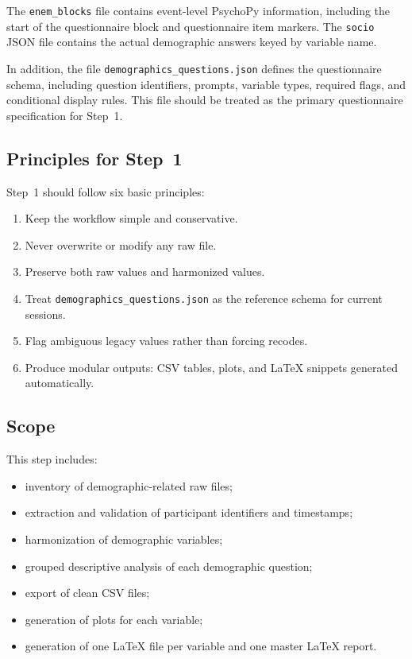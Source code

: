 \documentclass[11pt]{article}
\begin{document}
The \texttt{enem\_blocks} file contains event-level PsychoPy information, including the start of the
questionnaire block and questionnaire item markers.
The \texttt{socio} JSON file contains the actual demographic answers keyed by variable name.

In addition, the file \texttt{demographics\_questions.json} defines the questionnaire schema, including
question identifiers, prompts, variable types, required flags, and conditional display rules.
This file should be treated as the primary questionnaire specification for Step~1. \cite{step1_demo_schema}

\subsection{Principles for Step~1}
Step~1 should follow six basic principles:
\begin{enumerate}
    \item Keep the workflow simple and conservative.
    \item Never overwrite or modify any raw file.
    \item Preserve both raw values and harmonized values.
    \item Treat \texttt{demographics\_questions.json} as the reference schema for current sessions.
    \item Flag ambiguous legacy values rather than forcing recodes.
    \item Produce modular outputs: CSV tables, plots, and \LaTeX{} snippets generated automatically.
\end{enumerate}

\subsection{Scope}
This step includes:
\begin{itemize}
    \item inventory of demographic-related raw files;
    \item extraction and validation of participant identifiers and timestamps;
    \item harmonization of demographic variables;
    \item grouped descriptive analysis of each demographic question;
    \item export of clean CSV files;
    \item generation of plots for each variable;
    \item generation of one \LaTeX{} file per variable and one master \LaTeX{} report.
\end{itemize}
\end{document}
